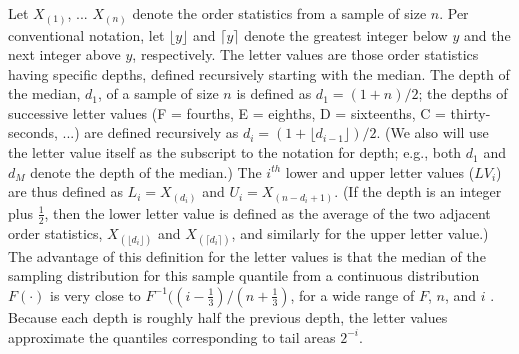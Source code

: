 \documentclass[oneside]{article}
\begin{document}
Let $X_{(1)}$, ... $X_{(n)}$ denote the order statistics from a sample of size
$n$. Per conventional notation, let $\lfloor y \rfloor$ and $\lceil y \rceil$
denote the greatest integer below $y$ and the next integer above $y$,
respectively. The letter values are those order statistics having specific
depths, defined recursively starting with the median. The depth of the median,
$d_1$, of a sample of size $n$ is defined as $d_1 = (1 + n )/2$; the depths of
successive letter values (F = fourths, E = eighths, D = sixteenths, C =
thirty-seconds, ...) are defined recursively as $d_i = (1 + \lfloor d_{i-1}
\rfloor)/2$. (We also will use the letter value itself as the subscript to the
notation for depth; e.g., both $d_1$ and $d_M$ denote the depth of the
median.) The $i^{th}$ lower and upper letter values ($LV_i$) are thus defined
as $L_i = X_{(d_i)}$ and $U_i = X_{(n - d_i + 1)}$. (If the depth is an
integer plus $\frac{1}{2}$, then the lower letter value is defined as the
average of the two adjacent order statistics, $X_{(\lfloor d_i \rfloor)}$ and
$X_{(\lceil d_i \rceil)}$, and similarly for the upper letter value.) The
advantage of this definition for the letter values is that the median of the
sampling distribution for this sample quantile from a continuous distribution
$F(\cdot)$ is very close to $F^{-1} ((i - \frac{1}{3})/(n + \frac{1}{3})$, for
a wide range of $F$, $n$, and $i$ \citep{dchlv}. Because each depth is roughly
half the previous depth, the letter values approximate the quantiles
corresponding to tail areas $2^{-i}$.
\end{document}
